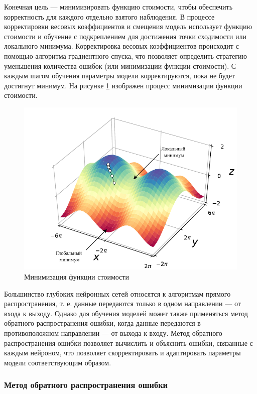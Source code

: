 Конечная цель --- минимизировать функцию стоимости, чтобы обеспечить корректность для каждого отдельно взятого наблюдения. В процессе корректировки весовых коэффициентов и смещения модель использует функцию стоимости и обучение с подкреплением для достижения точки сходимости или локального минимума. Корректировка весовых коэффициентов происходит с помощью алгоритма градиентного спуска, что позволяет определить стратегию уменьшения количества ошибок (или минимизации функции стоимости). С каждым шагом обучения параметры модели корректируются, пока не будет достигнут минимум. На рисунке \ref{fig:cost} изображен процесс минимизации функции стоимости.

\begin{figure}[H]
	\centering
	\includegraphics[width=\textwidth]{img/cost.pdf}
	\caption{Минимизация функции стоимости}
	\label{fig:cost}
\end{figure}

Большинство глубоких нейронных сетей относятся к алгоритмам прямого распространения, т. е. данные передаются только в одном направлении --- от входа к выходу. Однако для обучения моделей может также применяться метод обратного распространения ошибки, когда данные передаются в противоположном направлении --- от выхода к входу. Метод обратного распространения ошибки позволяет вычислить и объяснить ошибки, связанные с каждым нейроном, что позволяет скорректировать и адаптировать параметры модели соответствующим образом.

\subsubsection{Метод обратного распространения ошибки}

